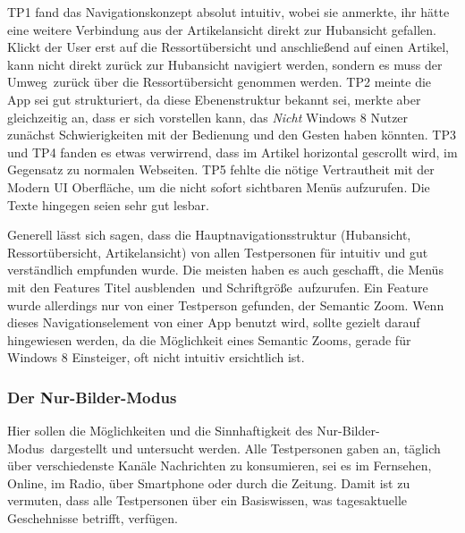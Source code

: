 \documentclass[12pt,a4paper,bibtotoc,abstracton]{scrartcl}
\begin{document}
TP1 fand das Navigationskonzept \glqq absolut intuitiv\grqq, wobei sie anmerkte, ihr hätte eine weitere Verbindung aus der Artikelansicht direkt zur Hubansicht gefallen. Klickt der User erst auf die Ressortübersicht und anschließend auf einen Artikel, kann nicht direkt zurück zur Hubansicht navigiert werden, sondern es muss der \glqq Umweg\grqq\ zurück über die Ressortübersicht genommen werden. TP2 meinte die App sei gut strukturiert, da diese Ebenenstruktur bekannt sei, merkte aber gleichzeitig an, dass er sich vorstellen kann, das \emph{Nicht} Windows 8 Nutzer zunächst Schwierigkeiten mit der Bedienung und den Gesten haben könnten. TP3 und TP4 fanden es etwas verwirrend, dass im Artikel horizontal gescrollt wird, im Gegensatz zu normalen Webseiten. TP5 \glqq fehlte die nötige Vertrautheit mit der Modern UI Oberfläche\grqq, um die nicht sofort sichtbaren Menüs aufzurufen. Die Texte hingegen seien sehr gut lesbar.

Generell lässt sich sagen, dass die Hauptnavigationsstruktur (Hubansicht, Ressortübersicht, Artikelansicht) von allen Testpersonen für intuitiv und gut verständlich empfunden wurde. Die meisten haben es auch geschafft, die Menüs mit den Features \glqq Titel ausblenden\grqq\ und \glqq Schriftgröße\grqq\ aufzurufen. Ein Feature wurde allerdings nur von einer Testperson gefunden, der \glqq Semantic Zoom\grqq. Wenn dieses Navigationselement von einer App benutzt wird, sollte gezielt darauf hingewiesen werden, da die Möglichkeit eines \glqq Semantic Zooms\grqq, gerade für Windows 8 Einsteiger, oft nicht intuitiv ersichtlich ist.

\subsubsection{Der Nur-Bilder-Modus}
\label{subsubsec:nurbildermodus}
Hier sollen die Möglichkeiten und die Sinnhaftigkeit des \glqq Nur-Bilder-Modus\grqq\  dargestellt und untersucht werden. Alle Testpersonen gaben an, täglich über verschiedenste Kanäle Nachrichten zu konsumieren, sei es im Fernsehen, Online, im Radio, über Smartphone oder durch die Zeitung. Damit ist zu vermuten, dass alle Testpersonen über ein Basiswissen, was tagesaktuelle Geschehnisse betrifft, verfügen.
\end{document}
